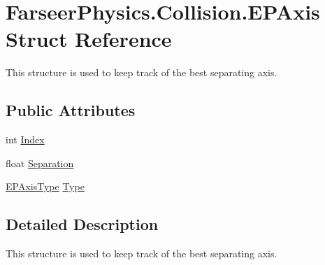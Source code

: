 \hypertarget{struct_farseer_physics_1_1_collision_1_1_e_p_axis}{\section{Farseer\+Physics.\+Collision.\+E\+P\+Axis Struct Reference}
\label{struct_farseer_physics_1_1_collision_1_1_e_p_axis}
}


This structure is used to keep track of the best separating axis.  


\subsection*{Public Attributes}
\begin{DoxyCompactItemize}
\item 
int \hyperlink{struct_farseer_physics_1_1_collision_1_1_e_p_axis_a120e07624033c34974e00281a684f263}{Index}
\item 
float \hyperlink{struct_farseer_physics_1_1_collision_1_1_e_p_axis_af41da094cfbb8817d6d0e72253af079e}{Separation}
\item 
\hyperlink{namespace_farseer_physics_1_1_collision_a8c0daff3dfe362c5f50bb4f69ebb8fe9}{E\+P\+Axis\+Type} \hyperlink{struct_farseer_physics_1_1_collision_1_1_e_p_axis_a02e60bdfbcca3011b702fb283d53412e}{Type}
\end{DoxyCompactItemize}


\subsection{Detailed Description}
This structure is used to keep track of the best separating axis. 



